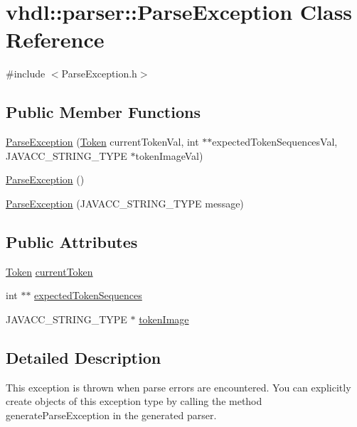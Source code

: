 \hypertarget{classvhdl_1_1parser_1_1_parse_exception}{}\section{vhdl\+::parser\+::Parse\+Exception Class Reference}
\label{classvhdl_1_1parser_1_1_parse_exception}


{\ttfamily \#include $<$Parse\+Exception.\+h$>$}

\subsection*{Public Member Functions}
\begin{DoxyCompactItemize}
\item 
\mbox{\hyperlink{classvhdl_1_1parser_1_1_parse_exception_aa1560102101159dc8718a4a163cc200b}{Parse\+Exception}} (\mbox{\hyperlink{classvhdl_1_1parser_1_1_token}{Token}} current\+Token\+Val, int $\ast$$\ast$expected\+Token\+Sequences\+Val, J\+A\+V\+A\+C\+C\+\_\+\+S\+T\+R\+I\+N\+G\+\_\+\+T\+Y\+PE $\ast$token\+Image\+Val)
\item 
\mbox{\hyperlink{classvhdl_1_1parser_1_1_parse_exception_aa8dbc5d8f42a4cc3375d7d21340dc95e}{Parse\+Exception}} ()
\item 
\mbox{\hyperlink{classvhdl_1_1parser_1_1_parse_exception_ac72d242f046713ece19b1ca09b456930}{Parse\+Exception}} (J\+A\+V\+A\+C\+C\+\_\+\+S\+T\+R\+I\+N\+G\+\_\+\+T\+Y\+PE message)
\end{DoxyCompactItemize}
\subsection*{Public Attributes}
\begin{DoxyCompactItemize}
\item 
\mbox{\hyperlink{classvhdl_1_1parser_1_1_token}{Token}} \mbox{\hyperlink{classvhdl_1_1parser_1_1_parse_exception_aadd2253ddf7f1c87444d51fc22efd9fe}{current\+Token}}
\item 
int $\ast$$\ast$ \mbox{\hyperlink{classvhdl_1_1parser_1_1_parse_exception_a28848a83d7553352654dd5ccb7ed40ef}{expected\+Token\+Sequences}}
\item 
J\+A\+V\+A\+C\+C\+\_\+\+S\+T\+R\+I\+N\+G\+\_\+\+T\+Y\+PE $\ast$ \mbox{\hyperlink{classvhdl_1_1parser_1_1_parse_exception_a59256facf9b653896026ab05f0eb4728}{token\+Image}}
\end{DoxyCompactItemize}


\subsection{Detailed Description}
This exception is thrown when parse errors are encountered. You can explicitly create objects of this exception type by calling the method generate\+Parse\+Exception in the generated parser.


